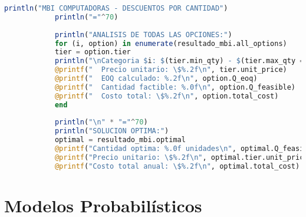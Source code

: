 \documentclass[12pt,a4paper]{book}
\begin{document}
\begin{tcolorbox}[enhanced,colback=violetaclaro,colframe=moradoacento,boxrule=3pt,arc=12pt,
		drop shadow,title={\Large\bfseries\color{white} \faTag\ DESCUENTOS POR CANTIDAD},breakable]
\begin{lstlisting}[language=Julia,basicstyle=\footnotesize\ttfamily]
			println("MBI COMPUTADORAS - DESCUENTOS POR CANTIDAD")
			println("="^70)
			
			println("ANALISIS DE TODAS LAS OPCIONES:")
			for (i, option) in enumerate(resultado_mbi.all_options)
			tier = option.tier
			println("\nCategoria $i: $(tier.min_qty) - $(tier.max_qty == Inf ? "Infinito" : tier.max_qty)")
			@printf("  Precio unitario: \$%.2f\n", tier.unit_price)
			@printf("  EOQ calculado: %.2f\n", option.Q_eoq)
			@printf("  Cantidad factible: %.0f\n", option.Q_feasible)
			@printf("  Costo total: \$%.2f\n", option.total_cost)
			end
			
			println("\n" * "="^70)
			println("SOLUCION OPTIMA:")
			optimal = resultado_mbi.optimal
			@printf("Cantidad optima: %.0f unidades\n", optimal.Q_feasible)
			@printf("Precio unitario: \$%.2f\n", optimal.tier.unit_price)
			@printf("Costo total anual: \$%.2f\n", optimal.total_cost)
		\end{lstlisting}
		
	\end{tcolorbox}
	
	\section{Modelos Probabil\'isticos}
	
\end{document}
